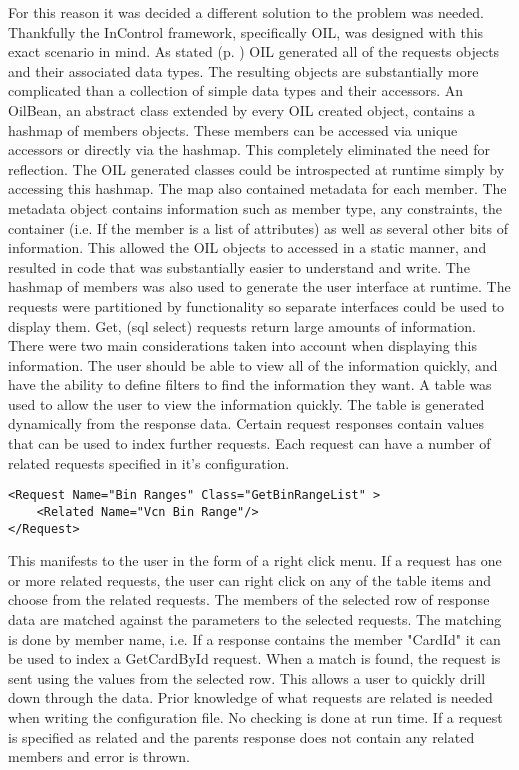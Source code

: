 \documentclass[a4paper, 11pt, titlepage]{article}
\begin{document}
For this reason it was decided a different solution to the problem was needed. Thankfully the InControl framework, specifically OIL, was designed with this exact scenario in mind. As stated (p. \pageref{OILIntro}) OIL generated all of the requests objects and their associated data types. The resulting objects are substantially more complicated than a collection of simple data types and their accessors. An OilBean, an abstract class extended by every OIL created object, contains a hashmap of members objects. These members can be accessed via unique accessors or directly via the hashmap. This completely eliminated the need for reflection. The OIL generated classes could be introspected at runtime simply by accessing this hashmap. The map also contained metadata for each member. The metadata object contains information such as member type, any constraints, the container (i.e. If the member is a list of attributes) as well as several other bits of information. This allowed the OIL objects to accessed in a static manner, and resulted in code that was substantially easier to understand and write.
The hashmap of members was also used to generate the user interface at runtime. The requests were partitioned by functionality so separate interfaces could be used to display them. Get, (sql select) requests return large amounts of information. There were two main considerations taken into account when displaying this information. The user should be able to view all of the information quickly, and have the ability to define filters to find the information they want. A table was used to allow the user to view the information quickly. The table is generated dynamically from the response data. Certain request responses contain values that can be used to index further requests. Each request can have a number of related requests specified in it's configuration.

\begin{verbatim}
<Request Name="Bin Ranges" Class="GetBinRangeList" >
    <Related Name="Vcn Bin Range"/>
</Request>
\end{verbatim}

This manifests to the user in the form of a right click menu. If a request has one or more related requests, the user can right click on any of the table items and choose from the related requests. The members of the selected row of response data are matched against the parameters to the selected requests. The matching is done by member name, i.e. If a response contains the member "CardId" it can be used to index a GetCardById request. When a match is found, the request is sent using the values from the selected row. This allows a user to quickly drill down through the data. Prior knowledge of what requests are related is needed when writing the configuration file. No checking is done at run time. If a request is specified as related and the parents response does not contain any related members and error is thrown.
\end{document}
